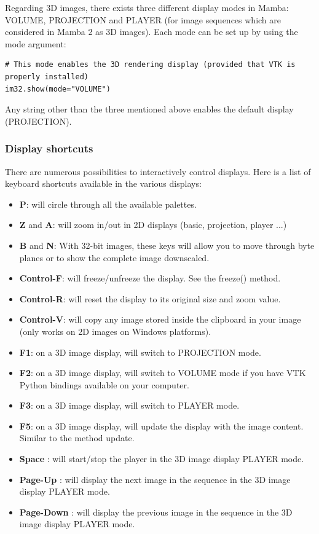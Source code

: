 \documentclass[a4paper,10pt,oneside]{article}
\begin{document}
Regarding 3D images, there exists three different display modes in Mamba: VOLUME, PROJECTION
and PLAYER (for image sequences which are considered in Mamba 2 as 3D images). Each mode can be set up
by using the mode argument:

\lstset{language=Python}
\begin{lstlisting}
# This mode enables the 3D rendering display (provided that VTK is properly installed)
im32.show(mode="VOLUME")
\end{lstlisting}

Any string other than the three mentioned above enables the default display (PROJECTION).

\subsubsection{Display shortcuts}
\label{cha:dis_shortcuts}

There are numerous possibilities to interactively control displays. Here is a list of
keyboard shortcuts available in the various displays:

\begin{itemize}
\item \textbf{P}: will circle through all the available palettes.
\item \textbf{Z} and \textbf{A}: will zoom in/out in 2D displays (basic, 
projection, player ...)
\item \textbf{B} and \textbf{N}: With 32-bit images, these keys will allow you
to move through byte planes or to show the complete image downscaled.
\item \textbf{Control-F}: will freeze/unfreeze the display. See the freeze() 
method.
\item \textbf{Control-R}: will reset the display to its original size and
zoom value.
\item \textbf{Control-V}: will copy any image stored inside the clipboard 
in your image (only works on 2D images on Windows platforms).
\item \textbf{F1}: on a 3D image display, will switch to PROJECTION mode.
\item \textbf{F2}: on a 3D image display, will switch to VOLUME mode
if you have VTK Python bindings available on your computer.
\item \textbf{F3}: on a 3D image display, will switch to PLAYER mode.
\item \textbf{F5}: on a 3D image display, will update the display with
the image content. Similar to the method update.
\item \textbf{Space} : will start/stop the player in the 3D image display
PLAYER mode.
\item \textbf{Page-Up} : will display the next image in the sequence in the
3D image display PLAYER mode.
\item \textbf{Page-Down} : will display the previous image in the sequence
in the 3D image display PLAYER mode.
\end{itemize}
\end{document}
